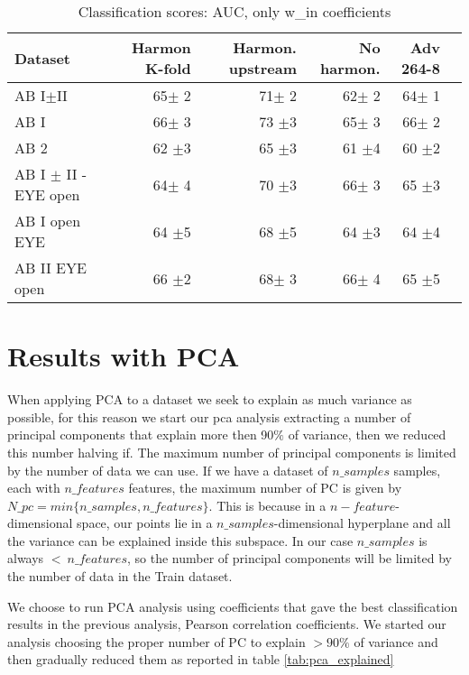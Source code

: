 \documentclass[12pt]{report}
\begin{document}
\begin{table}[!htp]\centering
\scriptsize
\begin{tabular}{lrrrrr}\toprule
Dataset &Harmon K-fold &Harmon. upstream &No harmon. &Adv 264-8 \\\midrule
AB I$\pm$II &65$\pm$ 2 &71$\pm$ 2 &62$\pm$ 2 &64$\pm$ 1 \\
AB I &66$\pm$ 3 &73 $\pm$3 &65$\pm$ 3 &66$\pm$ 2 \\
AB 2 &62 $\pm$3 &65 $\pm$3 &61 $\pm$4 &60 $\pm$2 \\
AB I $\pm$ II - EYE open &64$\pm$ 4 &70 $\pm$3 &66$\pm$ 3 &65 $\pm$3 \\
AB I open EYE &64 $\pm$5 &68 $\pm$5 &64 $\pm$3 &64 $\pm$4 \\
AB II EYE open &66 $\pm$2 &68$\pm$ 3 &66$\pm$ 4 &65 $\pm$5 \\
\bottomrule
\end{tabular}
\caption{Classification scores: AUC, only w\_in coefficients}\label{tab:classification_win}

\end{table}


\newpage

\section{Results with PCA}

When applying PCA to a dataset we seek to explain as much variance as possible, for this reason we start our pca analysis extracting a number of principal components that explain more then 90$\%$ of variance, then we reduced this number halving if.
The maximum number of principal components is limited by the number of data we can use. If we have a dataset of $n\_samples$ samples, each with $n\_features$ features, the maximum number of PC is given by $N\_pc = min\{n\_samples, n\_features\}$.
This is because in a $n-feature$-dimensional space, our points lie in a $n\_samples$-dimensional hyperplane and all the variance can be explained inside this subspace.
In our case $n\_samples$ is always $< \ n\_features$, so the number of principal components will be limited by the number of data in the Train dataset.

We choose to run PCA analysis using coefficients that gave the best classification results in the previous analysis, Pearson correlation coefficients.
We started our analysis choosing the proper number of PC to explain $> 90\%$ of variance and then gradually reduced them as reported in table \ref{tab:pca_explained}
\end{document}
